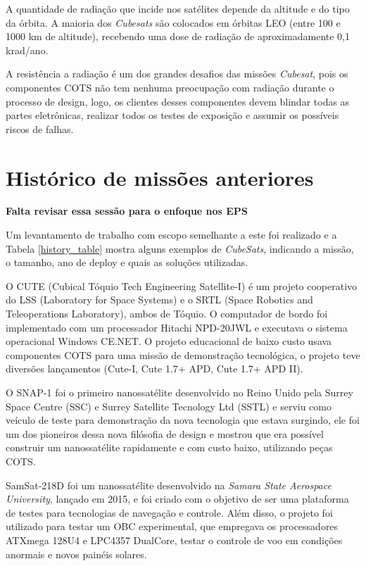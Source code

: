 A quantidade de radiação que incide nos satélites depende da altitude e do tipo da órbita. A maioria dos \textit{Cubesats} são colocados em órbitas LEO (entre 100 e 1000 km de altitude), recebendo uma dose de radiação de  aproximadamente 0,1 krad/ano.

A resistência a radiação é um dos grandes desafios das missões \textit{Cubesat}, pois os componentes COTS não tem nenhuma preocupação com radiação durante o processo de design, logo, os clientes desses componentes devem blindar todas as partes eletrônicas, realizar todos os testes de exposição e assumir os possíveis riscos de falhas.


\section{Histórico de missões anteriores}\label{missions_history}

\textbf{Falta revisar essa sessão para o enfoque nos EPS}

Um levantamento de trabalho com escopo semelhante a este foi realizado e a Tabela \ref{history_table} mostra alguns exemplos de \textit{CubeSats}, indicando a missão, o tamanho, ano de deploy e quais as soluções utilizadas.



O CUTE \cite{cute1_ref} (Cubical  Tóquio  Tech  Engineering  Satellite-I) é um projeto cooperativo do LSS (Laboratory for Space Systems) e o SRTL (Space Robotics and Teleoperations Laboratory), ambos de Tóquio. O computador de bordo foi implementado com um processador Hitachi NPD-20JWL e executava o sistema operacional Windows CE.NET. O  projeto  educacional  de  baixo  custo  usava componentes COTS para uma missão de demonstração tecnológica, o projeto teve diversões lançamentos (Cute-I, Cute 1.7+ APD, Cute 1.7+ APD II). 

O SNAP-1 \cite{snap1_ref} foi o primeiro nanossatélite desenvolvido no Reino Unido pela Surrey Space Centre (SSC) e Surrey Satellite Tecnology Ltd (SSTL) e serviu como veículo de teste para demonstração da nova tecnologia que estava surgindo, ele foi um dos pioneiros dessa nova filósofia de design e mostrou que era possível construir um nanossatélite rapidamente e com custo baixo, utilizando peças COTS.

SamSat-218D \cite{samsat218_ref} foi um nanossatélite desenvolvido na \textit{Samara State Aerospace University}, lançado em 2015, e foi criado com o objetivo de ser uma plataforma de testes para tecnologias de navegação e controle. Além disso, o projeto foi utilizado para testar um OBC experimental, que empregava os processadores ATXmega 128U4 e LPC4357 DualCore, testar o controle de voo em condições anormais e novos painéis solares.


